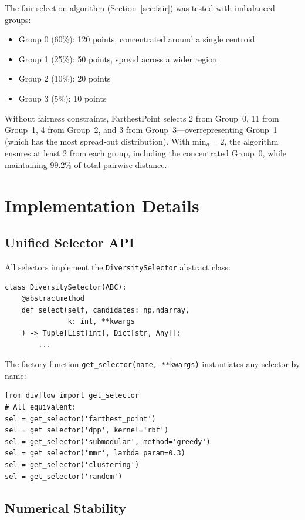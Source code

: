 \documentclass[11pt]{article}
\begin{document}
The fair selection algorithm (Section~\ref{sec:fair}) was tested
with imbalanced groups:
\begin{itemize}
\item Group 0 (60\%): 120 points, concentrated around a single centroid
\item Group 1 (25\%): 50 points, spread across a wider region
\item Group 2 (10\%): 20 points
\item Group 3 (5\%): 10 points
\end{itemize}

Without fairness constraints, FarthestPoint selects 2 from Group~0,
11 from Group~1, 4 from Group~2, and 3 from Group~3---overrepresenting
Group~1 (which has the most spread-out distribution). With
$\text{min}_g = 2$, the algorithm ensures at least 2 from each group,
including the concentrated Group~0, while maintaining 99.2\% of
total pairwise distance.

\section{Implementation Details}
\label{app:implementation}

\subsection{Unified Selector API}

All selectors implement the \texttt{DiversitySelector} abstract class:

\begin{verbatim}
class DiversitySelector(ABC):
    @abstractmethod
    def select(self, candidates: np.ndarray,
               k: int, **kwargs
    ) -> Tuple[List[int], Dict[str, Any]]:
        ...
\end{verbatim}

The factory function \texttt{get\_selector(name, **kwargs)} instantiates
any selector by name:

\begin{verbatim}
from divflow import get_selector
# All equivalent:
sel = get_selector('farthest_point')
sel = get_selector('dpp', kernel='rbf')
sel = get_selector('submodular', method='greedy')
sel = get_selector('mmr', lambda_param=0.3)
sel = get_selector('clustering')
sel = get_selector('random')
\end{verbatim}

\subsection{Numerical Stability}
\end{document}
